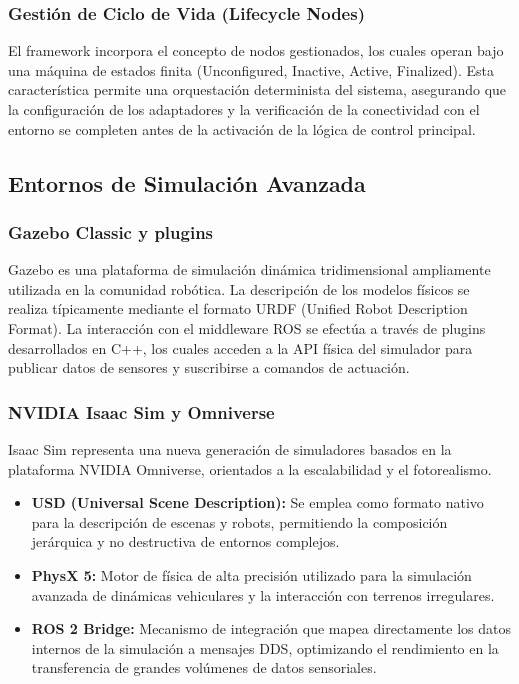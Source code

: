 \subsubsection{Gestión de Ciclo de Vida (Lifecycle Nodes)}
El framework incorpora el concepto de nodos gestionados, los cuales operan bajo una máquina de estados finita (Unconfigured, Inactive, Active, Finalized). Esta característica permite una orquestación determinista del sistema, asegurando que la configuración de los adaptadores y la verificación de la conectividad con el entorno se completen antes de la activación de la lógica de control principal.

\subsection{Entornos de Simulación Avanzada}

\subsubsection{Gazebo Classic y plugins}
Gazebo es una plataforma de simulación dinámica tridimensional ampliamente utilizada en la comunidad robótica. La descripción de los modelos físicos se realiza típicamente mediante el formato URDF (Unified Robot Description Format). La interacción con el middleware ROS se efectúa a través de plugins desarrollados en C++, los cuales acceden a la API física del simulador para publicar datos de sensores y suscribirse a comandos de actuación.

\subsubsection{NVIDIA Isaac Sim y Omniverse}
Isaac Sim representa una nueva generación de simuladores basados en la plataforma NVIDIA Omniverse, orientados a la escalabilidad y el fotorealismo.
\begin{itemize}
    \item \textbf{USD (Universal Scene Description):} Se emplea como formato nativo para la descripción de escenas y robots, permitiendo la composición jerárquica y no destructiva de entornos complejos.
    \item \textbf{PhysX 5:} Motor de física de alta precisión utilizado para la simulación avanzada de dinámicas vehiculares y la interacción con terrenos irregulares.
    \item \textbf{ROS 2 Bridge:} Mecanismo de integración que mapea directamente los datos internos de la simulación a mensajes DDS, optimizando el rendimiento en la transferencia de grandes volúmenes de datos sensoriales.
\end{itemize}


